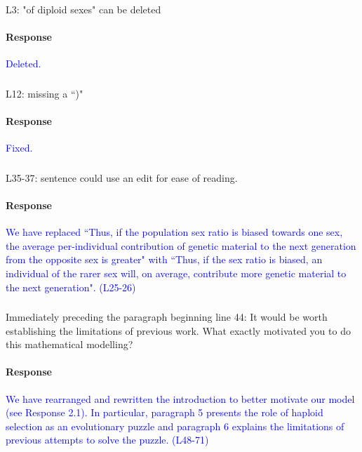 \documentclass[10pt,letterpaper]{article}
\begin{document}
\noindent\subsubsection{}
L3: "of diploid sexes" can be deleted

\noindent\paragraph{Response}
\textcolor{blue}{Deleted.}

\noindent\subsubsection{}
L12: missing a ``)"

\noindent\paragraph{Response}
\textcolor{blue}{Fixed.}

\noindent\subsubsection{}
L35-37: sentence could use an edit for ease of reading.

\noindent\paragraph{Response}
\textcolor{blue}{We have replaced ``Thus, if the population sex ratio is biased towards one sex, the average per-individual contribution of genetic material to the next generation from the opposite sex is greater" with ``Thus, if the sex ratio is biased, an individual of the rarer sex will, on average, contribute more genetic material to the next generation". (L25-26)}

\noindent\subsubsection{}
Immediately preceding the paragraph beginning line 44: It would be worth establishing the limitations of previous work. What exactly motivated you to do this mathematical modelling?

\noindent\paragraph{Response}
\textcolor{blue}{We have rearranged and rewritten the introduction to better motivate our model (see Response 2.1). In particular, paragraph 5 presents the role of haploid selection as an evolutionary puzzle and paragraph 6 explains the limitations of previous attempts to solve the puzzle. (L48-71)}
\end{document}
